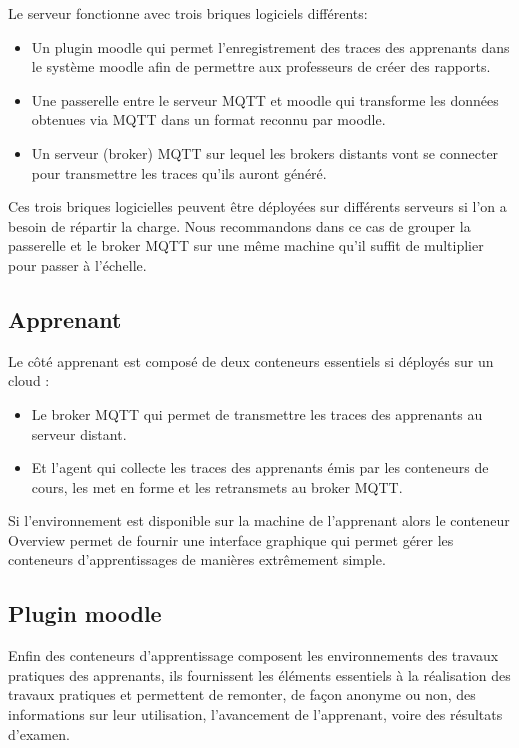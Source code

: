 \documentclass[a4paper,11pt]{report}
\begin{document}
Le serveur fonctionne avec trois briques logiciels différents:

\begin{itemize}
  \item Un plugin moodle qui permet l'enregistrement des traces des apprenants dans le système moodle afin de permettre aux professeurs de créer des rapports.
  \item Une passerelle entre le serveur MQTT et moodle qui transforme les données obtenues via MQTT dans un format reconnu par moodle.
  \item Un serveur (broker) MQTT sur lequel les brokers distants vont se connecter pour transmettre les traces qu'ils auront généré.
\end{itemize}

Ces trois briques logicielles peuvent être déployées sur différents serveurs si l'on a besoin de répartir la charge. Nous recommandons dans ce cas de grouper la passerelle et le broker MQTT sur une même machine qu'il suffit de multiplier pour passer à l'échelle.

\subsection{Apprenant}

Le côté apprenant est composé de deux conteneurs essentiels si déployés sur un cloud :

\begin{itemize}
  \item Le broker MQTT qui permet de transmettre les traces des apprenants au serveur distant.
  \item Et l'agent qui collecte les traces des apprenants émis par les conteneurs de cours, les met en forme et les retransmets au broker MQTT.
\end{itemize}

Si l'environnement est disponible sur la machine de l'apprenant alors le conteneur Overview permet de fournir une interface graphique qui permet gérer les conteneurs d'apprentissages de manières extrêmement simple.

\subsection{Plugin moodle}

Enfin des conteneurs d'apprentissage composent les environnements des travaux pratiques des apprenants, ils fournissent les éléments essentiels à la réalisation des travaux pratiques et permettent de remonter, de façon anonyme ou non, des informations sur leur utilisation, l'avancement de l'apprenant, voire des résultats d'examen.
\end{document}
